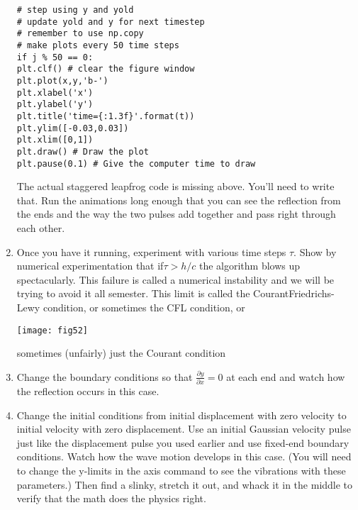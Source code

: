 \begin{problem}
\begin{enumerate}[label=(\alph*)]
\begin{lstlisting}
# step using y and yold
# update yold and y for next timestep
# remember to use np.copy
# make plots every 50 time steps
if j % 50 == 0:
plt.clf() # clear the figure window
plt.plot(x,y,'b-')
plt.xlabel('x')
plt.ylabel('y')
plt.title('time={:1.3f}'.format(t))
plt.ylim([-0.03,0.03])
plt.xlim([0,1])
plt.draw() # Draw the plot
plt.pause(0.1) # Give the computer time to draw
\end{lstlisting}
The actual staggered leapfrog code is missing above. You’ll need to
write that. Run the animations long enough that you can see the
reflection from the ends and the way the two pulses add together and
pass right through each other.
\item Once you have it running, experiment with various time steps $\tau$. Show
by numerical experimentation that if$ \tau > h/c$ the algorithm blows up
spectacularly. This failure is called a numerical instability and we
will be trying to avoid it all semester. This limit is called the CourantFriedrichs-Lewy condition, or sometimes the CFL condition, or 

\texttt{[image: fig52]}\label{fig:26}


sometimes (unfairly) just the Courant condition
\item Change the boundary conditions so that $ \frac{\partial y}{\partial x} = 0 $ at each end and watch
how the reflection occurs in this case.
\item Change the initial conditions from initial displacement with zero
velocity to initial velocity with zero displacement. Use an initial Gaussian velocity pulse just like the displacement pulse you used earlier
and use fixed-end boundary conditions. Watch how the wave motion
develops in this case. (You will need to change the y-limits in the axis
command to see the vibrations with these parameters.) Then find a
slinky, stretch it out, and whack it in the middle to verify that the math
does the physics right.

\end{enumerate}
\end{problem}
